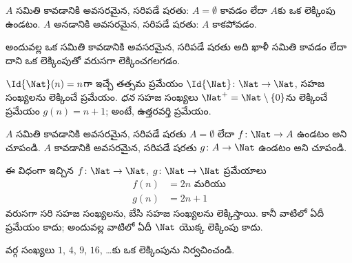 \documentclass[../../../include/open-logic-section]{subfiles}
\begin{document}
\begin{defn}
  $A$ సమితి  కావడానికి అవసరమైన, సరిపడే షరతు:
  $A = \emptyset$ కావడం లేదా $A$కు ఒక లెక్కింపు ఉండటం.
  $A$  అనడానికి అవసరమైన, సరిపడే షరతు:
  $A$  కాకపోవడం.
\end{defn}

\begin{explain}
అందువల్ల ఒక సమితి  కావడానికి అవసరమైన, సరిపడే
షరతు అది ఖాళీ సమితి కావడం లేదా దాని  ఒక లెక్కింపుతో
వరుసగా లెక్కించగలగడం.
\end{explain}

\begin{ex}
$\Id{\Nat}(n) = n$గా ఇచ్చే తత్సమ ప్రమేయం
$\Id{\Nat} \colon \Nat \to \Nat$, సహజ సంఖ్యలను లెక్కించే ప్రమేయం.
\emph{ధన} సహజ సంఖ్యలు $\Nat^+ = \Nat \setminus \{0\}$ను లెక్కించే
ప్రమేయం $g(n) = n + 1$; అంటే, ఉత్తరవర్తి ప్రమేయం.
\end{ex}

\begin{prob}
$A$ సమితి  కావడానికి అవసరమైన, సరిపడే షరతు
$A = \emptyset$ లేదా  $f\colon \Nat \to A$ ఉండటం అని
చూపండి. $A$  కావడానికి అవసరమైన, సరిపడే షరతు
 $g\colon A \to \Nat$ ఉండటం అని చూపండి.
\end{prob}

\begin{ex}
ఈ విధంగా ఇచ్చిన $f\colon \Nat \to \Nat$, $g \colon \Nat \to \Nat$
ప్రమేయాలు
\begin{align*}
  f(n) & = 2n \text{ మరియు}\\
  g(n) & = 2n+1
\end{align*}
వరుసగా సరి సహజ సంఖ్యలను, బేసి సహజ సంఖ్యలను లెక్కిస్తాయి. కానీ వాటిలో
ఏదీ  ప్రమేయం కాదు; అందువల్ల వాటిలో ఏదీ $\Nat$ యొక్క లెక్కింపు
కాదు.
\end{ex}

\begin{prob}
వర్గ సంఖ్యలు $1$, $4$, $9$, $16$, \dots{}కు ఒక లెక్కింపును నిర్వచించండి.
\end{prob}
\end{document}

